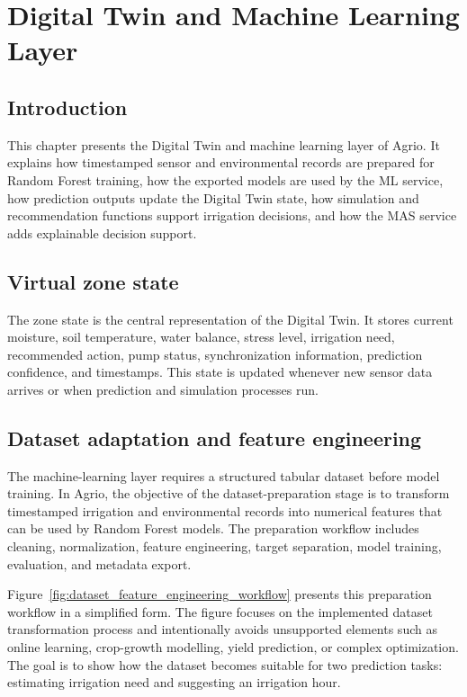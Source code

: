 ﻿\chapter{Digital Twin and Machine Learning Layer}

\section{Introduction}

This chapter presents the Digital Twin and machine learning layer of Agrio. It explains how timestamped sensor and environmental records are prepared for Random Forest training, how the exported models are used by the ML service, how prediction outputs update the Digital Twin state, how simulation and recommendation functions support irrigation decisions, and how the MAS service adds explainable decision support.

\section{Virtual zone state}

The zone state is the central representation of the Digital Twin. It stores current moisture, soil temperature, water balance, stress level, irrigation need, recommended action, pump status, synchronization information, prediction confidence, and timestamps. This state is updated whenever new sensor data arrives or when prediction and simulation processes run.

\section{Dataset adaptation and feature engineering}

The machine-learning layer requires a structured tabular dataset before model training. In Agrio, the objective of the dataset-preparation stage is to transform timestamped irrigation and environmental records into numerical features that can be used by Random Forest models. The preparation workflow includes cleaning, normalization, feature engineering, target separation, model training, evaluation, and metadata export.

Figure~\ref{fig:dataset_feature_engineering_workflow} presents this preparation workflow in a simplified form. The figure focuses on the implemented dataset transformation process and intentionally avoids unsupported elements such as online learning, crop-growth modelling, yield prediction, or complex optimization. The goal is to show how the dataset becomes suitable for two prediction tasks: estimating irrigation need and suggesting an irrigation hour.


